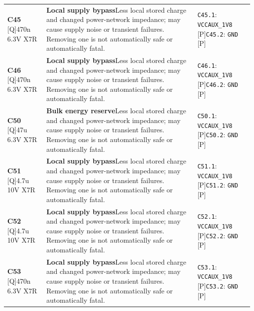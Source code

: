 \documentclass[11pt,a4paper]{article}
\begin{document}
\begin{longtable}{@{}P{27mm}P{77mm}P{62mm}@{}}
\textbf{C45} [Q]\newline 470n 6.3V X7R & \textbf{Local supply bypass}\newline Less local stored charge and changed power-network impedance; may cause supply noise or transient failures. Removing one is not automatically safe or automatically fatal. & \nolinkurl{C45.1}: \nolinkurl{VCCAUX_1V8} [P]\newline \nolinkurl{C45.2}: \nolinkurl{GND} [P] \\
\textbf{C46} [Q]\newline 470n 6.3V X7R & \textbf{Local supply bypass}\newline Less local stored charge and changed power-network impedance; may cause supply noise or transient failures. Removing one is not automatically safe or automatically fatal. & \nolinkurl{C46.1}: \nolinkurl{VCCAUX_1V8} [P]\newline \nolinkurl{C46.2}: \nolinkurl{GND} [P] \\
\textbf{C50} [Q]\newline 47u 6.3V X7R & \textbf{Bulk energy reserve}\newline Less local stored charge and changed power-network impedance; may cause supply noise or transient failures. Removing one is not automatically safe or automatically fatal. & \nolinkurl{C50.1}: \nolinkurl{VCCAUX_1V8} [P]\newline \nolinkurl{C50.2}: \nolinkurl{GND} [P] \\
\textbf{C51} [Q]\newline 4.7u 10V X7R & \textbf{Local supply bypass}\newline Less local stored charge and changed power-network impedance; may cause supply noise or transient failures. Removing one is not automatically safe or automatically fatal. & \nolinkurl{C51.1}: \nolinkurl{VCCAUX_1V8} [P]\newline \nolinkurl{C51.2}: \nolinkurl{GND} [P] \\
\textbf{C52} [Q]\newline 4.7u 10V X7R & \textbf{Local supply bypass}\newline Less local stored charge and changed power-network impedance; may cause supply noise or transient failures. Removing one is not automatically safe or automatically fatal. & \nolinkurl{C52.1}: \nolinkurl{VCCAUX_1V8} [P]\newline \nolinkurl{C52.2}: \nolinkurl{GND} [P] \\
\textbf{C53} [Q]\newline 470n 6.3V X7R & \textbf{Local supply bypass}\newline Less local stored charge and changed power-network impedance; may cause supply noise or transient failures. Removing one is not automatically safe or automatically fatal. & \nolinkurl{C53.1}: \nolinkurl{VCCAUX_1V8} [P]\newline \nolinkurl{C53.2}: \nolinkurl{GND} [P] \\

\end{longtable}
\end{document}
